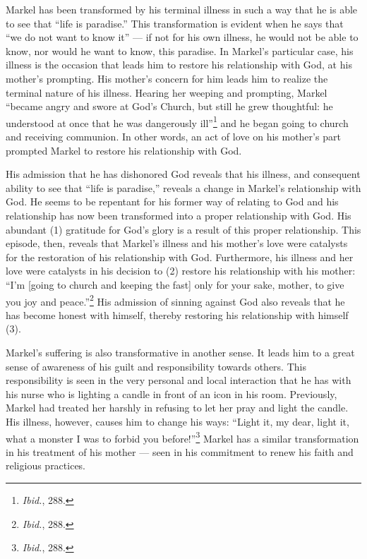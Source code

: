 Markel has been transformed by his terminal illness in such a way that he is able to see that ``life is paradise.'' This transformation is evident when he says that ``we do not want to know it'' --- if not for his own illness, he would not be able to know, nor would he want to know, this paradise. In Markel's particular case, his illness is the occasion that leads him to restore his relationship with God, at his mother's prompting. His mother's concern for him leads him to realize the terminal nature of his illness. Hearing her weeping and prompting, Markel ``became angry and swore at God's Church, but still he grew thoughtful: he understood at once that he was dangerously ill''\footnote{\emph{Ibid.}, 288.} and he began going to church and receiving communion. In other words, an act of love on his mother's part prompted Markel to restore his relationship with God. 

His admission that he has dishonored God reveals that his illness, and consequent ability to see that ``life is paradise,'' reveals a change in Markel's relationship with God. He seems to be repentant for his former way of relating to God and his relationship has now been transformed into a proper relationship with God. His abundant (1) gratitude for God's glory is a result of this proper relationship. This episode, then, reveals that Markel's illness and his mother's love were catalysts for the restoration of his relationship with God. Furthermore, his illness and her love were catalysts in his decision to (2) restore his relationship with his mother: ``I'm [going to church and keeping the fast] only for your sake, mother, to give you joy and peace.''\footnote{\emph{Ibid.}, 288.} His admission of sinning against God also reveals that he has become honest with himself, thereby restoring his relationship with himself (3).

Markel's suffering is also transformative in another sense. It leads him to a great sense of awareness of his guilt and responsibility towards others. This responsibility is seen in the very personal and local interaction that he has with his nurse who is lighting a candle in front of an icon in his room. Previously, Markel had treated her harshly in refusing to let her pray and light the candle. His illness, however, causes him to change his ways: ``Light it, my dear, light it, what a monster I was to forbid you before!''\footnote{\emph{Ibid.}, 288.} Markel has a similar transformation in his treatment of his mother --- seen in his commitment to renew his faith and religious practices. 

